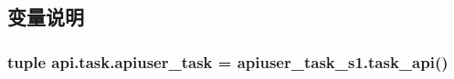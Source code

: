\subsection{变量说明}
\hypertarget{namespaceapi_1_1task_af0e5bba380e9fbfe39ba9bcbef437c98}{
\subsubsection[{apiuser\-\_\-task}]{\setlength{\rightskip}{0pt plus 5cm}tuple api.\-task.\-apiuser\-\_\-task = apiuser\-\_\-task\-\_\-s1.\-task\-\_\-api()}}\label{namespaceapi_1_1task_af0e5bba380e9fbfe39ba9bcbef437c98}
